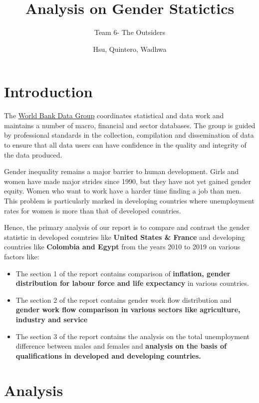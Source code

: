 \documentclass[
]{article}
\title{Analysis on Gender Statictics}
\subtitle{Team 6- The Outsiders}
\author{Hsu, Quintero, Wadhwa}
\date{}
\begin{document}
\maketitle

{
\setcounter{tocdepth}{2}
\tableofcontents
}
\hypertarget{introduction}{%
\section{Introduction}\label{introduction}}

The \href{https://data.worldbank.org/}{World Bank Data Group}
coordinates statistical and data work and maintains a number of macro,
financial and sector databases. The group is guided by professional
standards in the collection, compilation and dissemination of data to
ensure that all data users can have confidence in the quality and
integrity of the data produced.

Gender inequality remains a major barrier to human development. Girls
and women have made major strides since 1990, but they have not yet
gained gender equity. Women who want to work have a harder time finding
a job than men. This problem is particularly marked in developing
countries where unemployment rates for women is more than that of
developed countries.

Hence, the primary analysis of our report is to compare and contrast the
gender statistic in developed countries like \textbf{United States \&
France} and developing countries like \textbf{Colombia and Egypt} from
the years 2010 to 2019 on various factors like:

\begin{itemize}
\item
  The section 1 of the report contains comparison of \textbf{inflation,
  gender distribution for labour force and life expectancy} in various
  countries.
\item
  The section 2 of the report contains gender work flow distribution and
  \textbf{gender work flow comparison in various sectors like
  agriculture, industry and service}
\item
  The section 3 of the report contains the analysis on the total
  unemployment difference between males and females and \textbf{analysis
  on the basis of qualifications in developed and developing countries.}
\end{itemize}

\clearpage

\hypertarget{analysis}{%
\section{Analysis}\label{analysis}}
\end{document}
